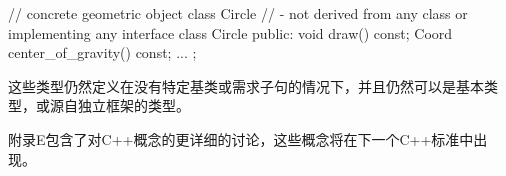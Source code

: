 \begin{cpp}
// concrete geometric object class Circle
// - not derived from any class or implementing any interface
class Circle {
	public:
	void draw() const;
	Coord center_of_gravity() const;
	...
};
\end{cpp}

这些类型仍然定义在没有特定基类或需求子句的情况下，并且仍然可以是基本类型，或源自独立框架的类型。

附录E包含了对C++概念的更详细的讨论，这些概念将在下一个C++标准中出现。



















